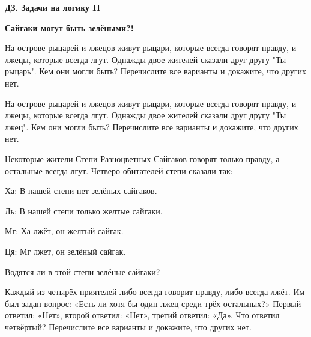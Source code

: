 \centerline{\bf \Huge ДЗ. Задачи на логику II}
\centerline{\bf \Huge }

\begin{flushright}
        \scriptsize{\textbf{Сайгаки могут быть зелёными?!}}
\end{flushright}

 На острове рыцарей и лжецов живут рыцари, которые всегда
говорят правду, и лжецы, которые всегда лгут. Однажды двое жителей сказали друг другу "Ты рыцарь". Кем они могли быть? Перечислите все варианты и докажите, что других нет.

 На острове рыцарей и лжецов живут рыцари, которые всегда
говорят правду, и лжецы, которые всегда лгут. Однажды двое жителей сказали друг другу "Ты лжец". Кем они могли быть? Перечислите все варианты и докажите, что других нет.

 Некоторые жители Степи Разноцветных Сайгаков говорят только правду, а остальные всегда лгут. Четверо обитателей степи сказали так:

Ха: В нашей степи нет зелёных сайгаков.

Ль: В нашей степи только желтые сайгаки.

Мг: Ха лжёт, он желтый сайгак.

Ця: Мг лжет, он зелёный сайгак.

Водятся ли в этой степи зелёные сайгаки? 


 Каждый из четырёх приятелей либо всегда говорит
правду, либо всегда лжёт. Им был задан вопрос: «Есть ли хотя бы один лжец среди трёх
остальных?» Первый ответил: «Нет», второй ответил: «Нет», третий ответил: «Да». Что ответил четвёртый? Перечислите все варианты и докажите, что других нет.